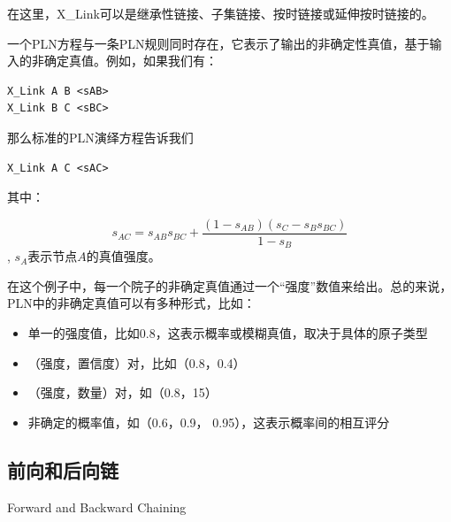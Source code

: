 在这里，X\_Link可以是继承性链接、子集链接、按时链接或延伸按时链接的。

一个PLN方程与一条PLN规则同时存在，它表示了输出的非确定性真值，基于输入的非确定真值。例如，如果我们有：

{\tt\begin{small}\begin{lstlisting}
X_Link A B <sAB>
X_Link B C <sBC>
\end{lstlisting}\end{small}}



那么标准的PLN演绎方程告诉我们

{\tt\begin{small}\begin{lstlisting}
X_Link A C <sAC>
\end{lstlisting}\end{small}}

其中： 

$$
s_{AC}=s_{AB}s_{BC}+\frac{\left(1-s_{AB}\right)\left(s_C-s_Bs_{BC}\right)}{1-s_B}
$$, $s_A$表示节点$A$的真值强度。

在这个例子中，每一个院子的非确定真值通过一个“强度”数值来给出。总的来说，PLN中的非确定真值可以有多种形式，比如：

\begin{itemize}
\item 单一的强度值，比如0.8，这表示概率或模糊真值，取决于具体的原子类型
\item （强度，置信度）对，比如（0.8，0.4）
\item （强度，数量）对，如（0.8，15）
\item 非确定的概率值，如（0.6，0.9， 0.95），这表示概率间的相互评分
\end{itemize}

\subsection{前向和后向链}{Forward and Backward Chaining}

